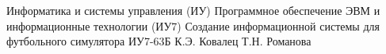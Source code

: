 \makecourseworktitle
{Информатика и системы управления (ИУ)}
{Программное обеспечение ЭВМ и информационные технологии (ИУ7)}
{Создание информационной системы для футбольного симулятора}
{ИУ7-63Б}
{К.Э. Ковалец}
{Т.Н. Романова}{}{}
